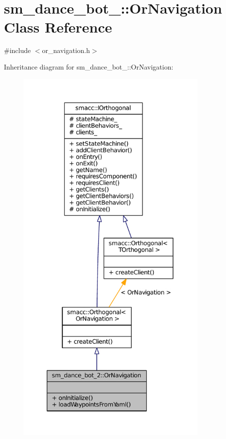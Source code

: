 \hypertarget{classsm__dance__bot__2_1_1OrNavigation}{}\section{sm\+\_\+dance\+\_\+bot\+\_\+:\+:Or\+Navigation Class Reference}
\label{classsm__dance__bot__2_1_1OrNavigation}


{\ttfamily \#include $<$or\+\_\+navigation.\+h$>$}



Inheritance diagram for sm\+\_\+dance\+\_\+bot\+\_\+:\+:Or\+Navigation\+:
\nopagebreak
\begin{figure}[H]
\begin{center}
\leavevmode
\includegraphics[height=550pt]{classsm__dance__bot__2_1_1OrNavigation__inherit__graph}
\end{center}
\end{figure}



